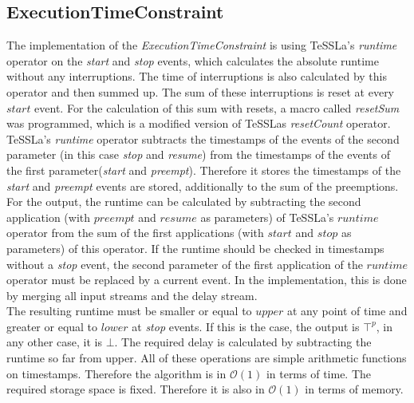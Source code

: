 \subsection{ExecutionTimeConstraint}
	The implementation of the \emph{ExecutionTimeConstraint} is using TeSSLa's \emph{runtime} operator on the \emph{start} and \emph{stop} events, which calculates the absolute runtime without any interruptions. The time of interruptions is also calculated by this operator and then summed up. The sum of these interruptions is reset at every $start$ event. For the calculation of this sum with resets, a macro called \textit{resetSum} was programmed, which is a modified version of TeSSLas \textit{resetCount} operator.\\
	TeSSLa's \emph{runtime} operator subtracts the timestamps of the events of the second parameter (in this case \emph{stop} and \emph{resume}) from the timestamps of the events of the first parameter(\emph{start} and \emph{preempt}). Therefore it stores the timestamps of the \emph{start} and \emph{preempt} events are stored, additionally to the sum of the preemptions.
	For the output, the runtime can be calculated by subtracting the second application (with $preempt$ and $resume$ as parameters) of TeSSLa's $runtime$ operator from the sum of the first applications (with $start$ and $stop$ as parameters) of this operator. If the runtime should be checked in timestamps without a \emph{stop} event, the second parameter of the first application of the $runtime$ operator must be replaced by a current event. In the implementation, this is done by merging all input streams and the delay stream.\\
	The resulting runtime must be smaller or equal to $upper$ at any point of time and greater or equal to $lower$ at \emph{stop} events. If this is the case, the output is $\top^p$, in any other case, it is $\bot$. The required delay is calculated by subtracting the runtime so far from upper. All of these operations are simple arithmetic functions on timestamps. Therefore the algorithm is in $\mathcal{O}(1)$ in terms of time. The required storage space is fixed. Therefore it is also in $\mathcal{O}(1)$ in terms of memory.

